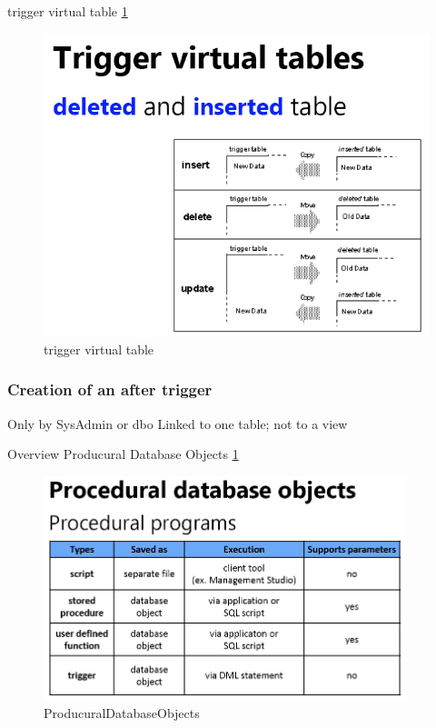 \documentclass{report}
\begin{document}
    trigger virtual table \ref{fig:triggerVirtualTable}
    \begin{figure}
        \includegraphics[width=400pt]{./images/triggerVirtualTable.png}
        \caption{\label{fig:triggerVirtualTable}trigger virtual table}
    \end{figure}

    \subsubsection{Creation of an after trigger}
    Only by SysAdmin or dbo
    Linked to one table; not to a view
    
    Overview Producural Database Objects \ref{fig:triggerVirtualTable}
    \begin{figure}
        \includegraphics[width=300pt]{./images/ProducuralDatabaseObjects.png}
        \caption{\label{fig:ProducuralDatabaseObjects}ProducuralDatabaseObjects}
    \end{figure}
    
\end{document}
